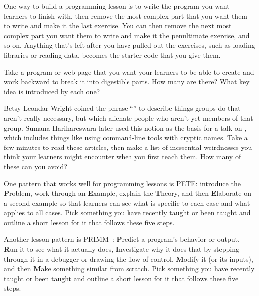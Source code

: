 
One way to build a programming lesson is
to write the program you want learners to finish with,
then remove the most complex part that you want them to write
and make it the last exercise.
You can then remove the next most complex part you want them to write
and make it the penultimate exercise,
and so on.
Anything that's left after you have pulled out the exercises,
such as loading libraries or reading data,
becomes the starter code that you give them.

Take a program or web page that you want your learners to be able to create
and work backward to break it into digestible parts.
How many are there?
What key idea is introduced by each one?


Betsy Leondar-Wright coined the phrase
``''
to describe things groups do
that aren't really necessary,
but which alienate people who aren't yet members of that group.
Sumana Harihareswara later used this notion
as the basis for a talk on
,
which includes things like using command-line tools with cryptic names.
Take a few minutes to read these articles,
then make a list of inessential weirdnesses you think your learners might encounter
when you first teach them.
How many of these can you avoid?


One pattern that works well for programming lessons is PETE:
introduce the \textbf{P}roblem,
work through an \textbf{E}xample,
explain the \textbf{T}heory,
and then \textbf{E}laborate on a second example
so that learners can see what is specific to each case and what applies to all cases.
Pick something you have recently taught or been taught
and outline a short lesson for it that follows these five steps.


Another lesson pattern is PRIMM~\cite{Sent2019}:
\textbf{P}redict a program's behavior or output,
\textbf{R}un it to see what it actually does,
\textbf{I}nvestigate why it does that by stepping through it in a debugger or drawing the flow of control,
\textbf{M}odify it (or its inputs),
and then \textbf{M}ake something similar from scratch.
Pick something you have recently taught or been taught
and outline a short lesson for it that follows these five steps.

